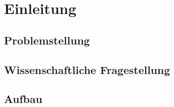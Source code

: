 \chapter{Einleitung}
\label{sec:INTRO}

\section{Problemstellung}
\label{sec:INTRO_PROBLEM}

\section{Wissenschaftliche Fragestellung}
\label{sec:INTRO_SCIENTIFIC_QUESTION}

\section{Aufbau}
\label{sec:INTRO_STRUCTURE}

